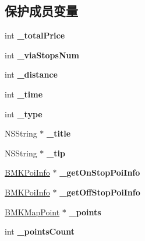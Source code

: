 \subsection*{保护成员变量}
\begin{DoxyCompactItemize}
\item 
\hypertarget{interface_b_m_k_line_a654d004f296ef94406aa4fdcbc942ad5}{int {\bfseries \-\_\-total\-Price}}\label{interface_b_m_k_line_a654d004f296ef94406aa4fdcbc942ad5}

\item 
\hypertarget{interface_b_m_k_line_a96b7d429c9f8a8b0d29aed3caf956f56}{int {\bfseries \-\_\-via\-Stops\-Num}}\label{interface_b_m_k_line_a96b7d429c9f8a8b0d29aed3caf956f56}

\item 
\hypertarget{interface_b_m_k_line_a2e7a14672b675d089fd2901295d25673}{int {\bfseries \-\_\-distance}}\label{interface_b_m_k_line_a2e7a14672b675d089fd2901295d25673}

\item 
\hypertarget{interface_b_m_k_line_a4e7d20d210d9a263062e21e34e4e143e}{int {\bfseries \-\_\-time}}\label{interface_b_m_k_line_a4e7d20d210d9a263062e21e34e4e143e}

\item 
\hypertarget{interface_b_m_k_line_a5fcb42fec4bf8715049776029312757c}{int {\bfseries \-\_\-type}}\label{interface_b_m_k_line_a5fcb42fec4bf8715049776029312757c}

\item 
\hypertarget{interface_b_m_k_line_ae029128ffc699ec5b89103a80343cc6c}{N\-S\-String $\ast$ {\bfseries \-\_\-title}}\label{interface_b_m_k_line_ae029128ffc699ec5b89103a80343cc6c}

\item 
\hypertarget{interface_b_m_k_line_ac24f2b082099c8b2cf6d8f4de06047dc}{N\-S\-String $\ast$ {\bfseries \-\_\-tip}}\label{interface_b_m_k_line_ac24f2b082099c8b2cf6d8f4de06047dc}

\item 
\hypertarget{interface_b_m_k_line_a50f2f33f1f170718e3e1e421c83b47cb}{\hyperlink{interface_b_m_k_poi_info}{B\-M\-K\-Poi\-Info} $\ast$ {\bfseries \-\_\-get\-On\-Stop\-Poi\-Info}}\label{interface_b_m_k_line_a50f2f33f1f170718e3e1e421c83b47cb}

\item 
\hypertarget{interface_b_m_k_line_a284c8a3e2d460bb47f53990b2f98fac4}{\hyperlink{interface_b_m_k_poi_info}{B\-M\-K\-Poi\-Info} $\ast$ {\bfseries \-\_\-get\-Off\-Stop\-Poi\-Info}}\label{interface_b_m_k_line_a284c8a3e2d460bb47f53990b2f98fac4}

\item 
\hypertarget{interface_b_m_k_line_a238759e096aa6b7fd31fb800a5baae7e}{\hyperlink{struct_b_m_k_map_point}{B\-M\-K\-Map\-Point} $\ast$ {\bfseries \-\_\-points}}\label{interface_b_m_k_line_a238759e096aa6b7fd31fb800a5baae7e}

\item 
\hypertarget{interface_b_m_k_line_ae85eada76152eedd34b6fb55f81bc21a}{int {\bfseries \-\_\-points\-Count}}\label{interface_b_m_k_line_ae85eada76152eedd34b6fb55f81bc21a}

\end{DoxyCompactItemize}

